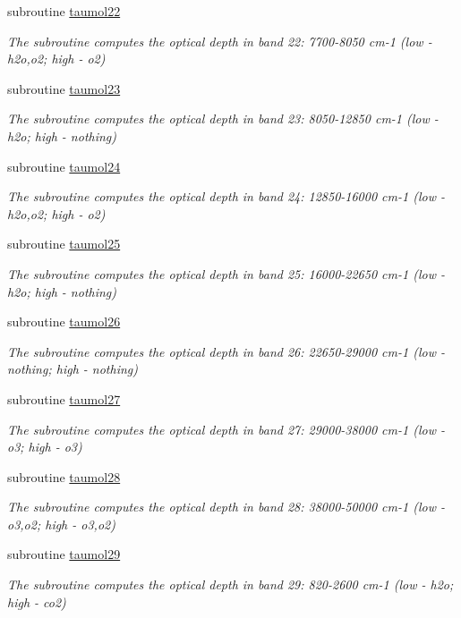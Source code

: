 \begin{DoxyCompactItemize}
subroutine \hyperlink{radsw__main_8f_a3b5392346eee35eb13a2a54175b6338b}{taumol22}
\begin{DoxyCompactList}\small\item\em The subroutine computes the optical depth in band 22\+: 7700-\/8050 cm-\/1 (low -\/ h2o,o2; high -\/ o2) \end{DoxyCompactList}\item 
subroutine \hyperlink{radsw__main_8f_adf5d73763c80ec079b72dda7d74cba94}{taumol23}
\begin{DoxyCompactList}\small\item\em The subroutine computes the optical depth in band 23\+: 8050-\/12850 cm-\/1 (low -\/ h2o; high -\/ nothing) \end{DoxyCompactList}\item 
subroutine \hyperlink{radsw__main_8f_ae0abf1a08aa5d6ca14bfea83d0603716}{taumol24}
\begin{DoxyCompactList}\small\item\em The subroutine computes the optical depth in band 24\+: 12850-\/16000 cm-\/1 (low -\/ h2o,o2; high -\/ o2) \end{DoxyCompactList}\item 
subroutine \hyperlink{radsw__main_8f_a21b72d6de9247eccb20de836ea76cf7a}{taumol25}
\begin{DoxyCompactList}\small\item\em The subroutine computes the optical depth in band 25\+: 16000-\/22650 cm-\/1 (low -\/ h2o; high -\/ nothing) \end{DoxyCompactList}\item 
subroutine \hyperlink{radsw__main_8f_a20261640145a5d10e091ef3c67763175}{taumol26}
\begin{DoxyCompactList}\small\item\em The subroutine computes the optical depth in band 26\+: 22650-\/29000 cm-\/1 (low -\/ nothing; high -\/ nothing) \end{DoxyCompactList}\item 
subroutine \hyperlink{radsw__main_8f_a7d2cea6cc0cfde853d25a14ba0efcca2}{taumol27}
\begin{DoxyCompactList}\small\item\em The subroutine computes the optical depth in band 27\+: 29000-\/38000 cm-\/1 (low -\/ o3; high -\/ o3) \end{DoxyCompactList}\item 
subroutine \hyperlink{radsw__main_8f_a2113c76707f43cf91fe5926ab69d1b8b}{taumol28}
\begin{DoxyCompactList}\small\item\em The subroutine computes the optical depth in band 28\+: 38000-\/50000 cm-\/1 (low -\/ o3,o2; high -\/ o3,o2) \end{DoxyCompactList}\item 
subroutine \hyperlink{radsw__main_8f_a08e2db10432d07392f29a49bc5b5c640}{taumol29}
\begin{DoxyCompactList}\small\item\em The subroutine computes the optical depth in band 29\+: 820-\/2600 cm-\/1 (low -\/ h2o; high -\/ co2) \end{DoxyCompactList}\end{DoxyCompactItemize}
